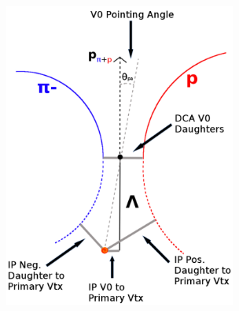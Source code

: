 \documentclass[../AnalysisNoteJBuxton.tex]{subfiles}
\begin{document}
\begin{figure}[h]
\begin{minipage}{18pc}
\includegraphics[width=18pc]{3_DataSelection/Figures/V0Cuts.pdf}
\end{minipage}\hspace{2pc}
\begin{minipage}{18pc}

\end{minipage}
\end{figure}
\end{document}
